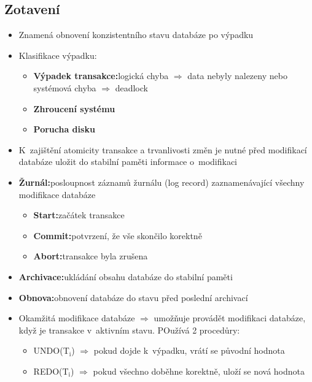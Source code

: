 \documentclass[a4paper,10pt]{article}
\newcommand{\pojem}[2]{\item \textbf{#1:}\quad #2}
\newcommand{\tedy}{$\Rightarrow$ }
\begin{document}
    \subsection{Zotavení}
      \begin{itemize}
        \item Znamená obnovení konzistentního stavu databáze po výpadku
        \item Klasifikace výpadku:
        \begin{itemize}
          \pojem{Výpadek transakce}{logická chyba \tedy data nebyly nalezeny nebo systémová chyba \tedy deadlock}
          \item \textbf{Zhroucení systému}
          \item \textbf{Porucha disku}
        \end{itemize}
        \item K~zajištění atomicity transakce a trvanlivosti změn je nutné před modifikací databáze uložit do stabilní paměti informace o~modifikaci
        \pojem{Žurnál}{posloupnost záznamů žurnálu (log record) zaznamenávající všechny modifikace databáze}
        \begin{itemize}
          \pojem{Start}{začátek transakce}
          \pojem{Commit}{potvrzení, že vše skončilo korektně}
          \pojem{Abort}{transakce byla zrušena}
        \end{itemize}
        \pojem{Archivace}{ukládání obsahu databáze do stabilní paměti}
        \pojem{Obnova}{obnovení databáze do stavu před poslední archivací}
        \item Okamžitá modifikace databáze \tedy umožňuje provádět modifikaci databáze, když je transakce v~aktivním stavu. POužívá 2 procedůry:
        \begin{itemize}
          \item UNDO(T$_\textrm{i}$) \tedy pokud dojde k~výpadku, vrátí se původní hodnota
          \item REDO(T$_\textrm{i}$) \tedy pokud všechno doběhne korektně, uloží se nová hodnota
        \end{itemize}
      \end{itemize}
      \begin{figure}[h!]
        \centering
      \end{figure}
\end{document}
